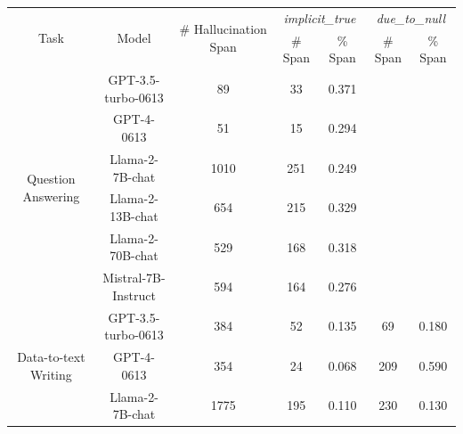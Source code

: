 \documentclass[11pt]{article}
\begin{document}
\begin{table}[h]
\centering
\small
\begin{tabular}{c|cccccc}
\toprule
\multirow{2}{*}{Task}                 & \multirow{2}{*}{Model} & \multirow{2}{*}{\# Hallucination Span} & \multicolumn{2}{c}{\it{implicit\_true}} & \multicolumn{2}{c}{\it{due\_to\_null}} \\
                                      &                        &                                        & \# Span          & \% Span         & \# Span         & \% Span         \\
\midrule
\multirow{6}{*}{Question Answering}   & GPT-3.5-turbo-0613     & 89                                     & 33               & 0.371           &                 &                 \\
                                      & GPT-4-0613             & 51                                     & 15               & 0.294           &                 &                 \\
                                      & Llama-2-7B-chat        & 1010                                   & 251              & 0.249           &                 &                 \\
                                      & Llama-2-13B-chat       & 654                                    & 215              & 0.329           &                 &                 \\
                                      & Llama-2-70B-chat       & 529                                    & 168              & 0.318           &                 &                 \\
                                      & Mistral-7B-Instruct    & 594                                    & 164              & 0.276           &                 &                 \\
\midrule
\multirow{6}{*}{Data-to-text Writing} & GPT-3.5-turbo-0613     & 384                                    & 52               & 0.135           & 69              & 0.180           \\
                                      & GPT-4-0613             & 354                                    & 24               & 0.068           & 209             & 0.590           \\
                                      & Llama-2-7B-chat        & 1775                                   & 195              & 0.110           & 230             & 0.130           \\

\end{tabular}
\end{table}
\end{document}
